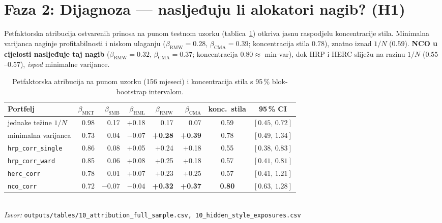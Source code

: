 \documentclass[11pt]{article}
\newcommand{\izvor}[1]{{\footnotesize\textit{Izvor:} \texttt{#1}}}
\begin{document}
\section{Faza 2: Dijagnoza --- nasljeđuju li alokatori nagib? (H1)}

Petfaktorska atribucija ostvarenih prinosa na punom testnom uzorku
(tablica~\ref{tab:attr}) otkriva jasnu raspodjelu koncentracije stila. Minimalna
varijanca naginje profitabilnosti i niskom ulaganju ($\beta_{\text{RMW}}=0.28$,
$\beta_{\text{CMA}}=0.39$; koncentracija stila $0.78$), znatno iznad $1/N$
($0.59$). \textbf{NCO u cijelosti nasljeđuje taj nagib}
($\beta_{\text{RMW}}=0.32$, $\beta_{\text{CMA}}=0.37$; koncentracija $0.80\approx$
min-var), dok HRP i HERC sliježu na razinu $1/N$ ($0.55$--$0.57$), \emph{ispod}
minimalne varijance.

\begin{table}[!htbp]
  \centering
  \caption{Petfaktorska atribucija na punom uzorku (156 mjeseci) i koncentracija
  stila s 95\,\% blok-bootstrap intervalom.}
  \label{tab:attr}
  \footnotesize
  \setlength{\tabcolsep}{4.2pt}
  \begin{tabular}{lrrrrrcc}
    \toprule
    Portfelj & $\beta_{\text{MKT}}$ & $\beta_{\text{SMB}}$ & $\beta_{\text{HML}}$ &
    $\beta_{\text{RMW}}$ & $\beta_{\text{CMA}}$ & konc.\ stila & 95\,\% CI \\
    \midrule
    jednake težine $1/N$         & 0.98 & 0.17 & +0.18 & 0.17 & 0.07 & 0.59 & $[0.45,\,0.72]$ \\
    minimalna varijanca          & 0.73 & 0.04 & $-0.07$ & \textbf{+0.28} & \textbf{+0.39} & 0.78 & $[0.49,\,1.34]$ \\
    \texttt{hrp\_corr\_single}   & 0.86 & 0.08 & +0.05 & +0.24 & +0.18 & 0.55 & $[0.38,\,0.83]$ \\
    \texttt{hrp\_corr\_ward}     & 0.85 & 0.06 & +0.08 & +0.25 & +0.18 & 0.57 & $[0.41,\,0.81]$ \\
    \texttt{herc\_corr}          & 0.78 & 0.01 & +0.07 & +0.23 & +0.25 & 0.57 & $[0.41,\,1.21]$ \\
    \texttt{nco\_corr}           & 0.72 & $-0.07$ & $-0.04$ & \textbf{+0.32} & \textbf{+0.37} & \textbf{0.80} & $[0.63,\,1.28]$ \\
    \bottomrule
  \end{tabular}\\[0.3em]
  \izvor{outputs/tables/10\_attribution\_full\_sample.csv, 10\_hidden\_style\_exposures.csv}
\end{table}
\end{document}
